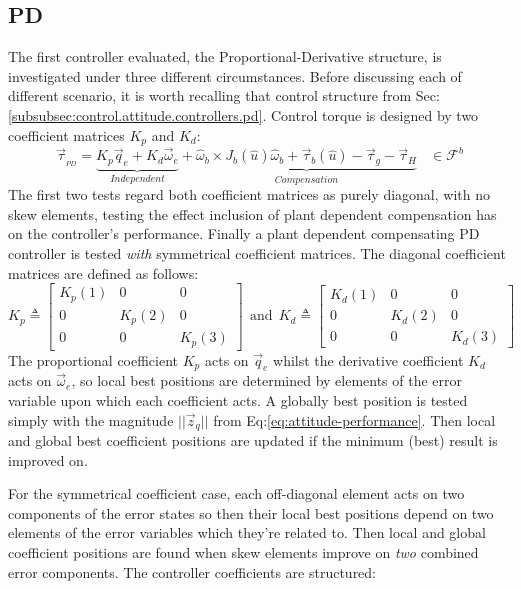 \subsection{PD}
\label{subsec:simulation.attitude.pd}
The first controller evaluated, the Proportional-Derivative structure, is investigated under three different circumstances. Before discussing each of different scenario, it is worth recalling that control structure from Sec:\ref{subsubsec:control.attitude.controllers.pd}. Control torque is designed by two coefficient matrices $K_p$ and $K_d$:
\begin{equation}\label{eq:simulation-attitde-pd}
\vec{\tau}_{_{PD}}=\underbrace{K_p\vec{q}_e+K_d\vec{\omega}_e}_{Independent}+\underbrace{\hat{\omega}_b\times J_b(\hat{u})\hat{\omega}_b+\vec{\tau}_b(\hat{u})-\vec{\tau}_g-\vec{\tau}_H}_{Compensation}~~~~\in\mathcal{F}^{b}
\end{equation}
The first two tests regard both coefficient matrices as purely diagonal, with no skew elements, testing the effect inclusion of plant dependent compensation has on the controller's performance. Finally a plant dependent compensating PD controller is tested \emph{with} symmetrical coefficient matrices. The diagonal coefficient matrices are defined as follows:
\begin{equation}\label{eq:simulation-attitde-pd-diagonal-coefficients}
K_p\triangleq \begin{bmatrix}
K_p(1) & 0 & 0\\
0 & K_p(2) & 0\\
0 & 0 & K_p(3)
\end{bmatrix}
~~\text{and}~~K_d\triangleq \begin{bmatrix}
K_d(1) & 0 & 0\\
0 & K_d(2) & 0\\
0 & 0 & K_d(3)
\end{bmatrix}
\end{equation}
The proportional coefficient $K_p$ acts on $\vec{q}_e$ whilst the derivative coefficient $K_d$ acts on $\vec{\omega}_e$, so local best positions are determined by elements of the error variable upon which each coefficient acts. A globally best position is tested simply with the magnitude $||\vec{z}_q||$ from Eq:\ref{eq:attitude-performance}. Then local and global best coefficient positions are updated if the minimum (best) result is improved on. 
\par
For the symmetrical coefficient case, each off-diagonal element acts on two components of the error states so then their local best positions depend on two elements of the error variables which they're related to. Then local and global coefficient positions are found when skew elements improve on \emph{two} combined error components. The  controller coefficients are structured:
